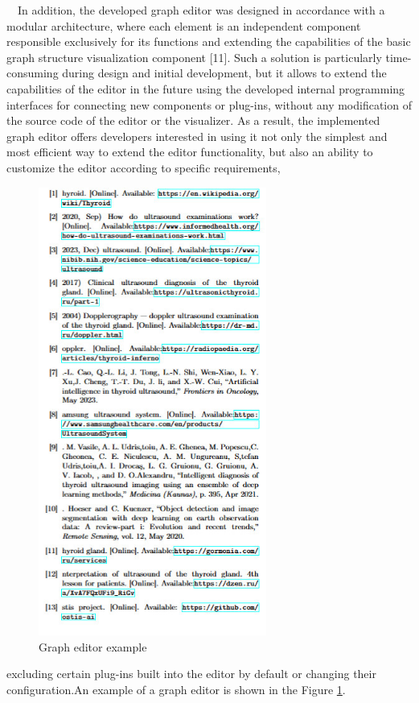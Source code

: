 \documentclass[a4paper]{article}
\begin{document}
\begin{multicols}{2}
\begin{justify}
~~In addition, the developed graph editor was designed
in accordance with a modular architecture, where each
element is an independent component responsible exclusively for its functions and extending the capabilities of
the basic graph structure visualization component [11].
Such a solution is particularly time-consuming during
design and initial development, but it allows to extend
the capabilities of the editor in the future using the developed internal programming interfaces for connecting
new components or plug-ins, without any modification of
the source code of the editor or the visualizer. As a result,
the implemented graph editor offers developers interested
in using it not only the simplest and most efficient way
to extend the editor functionality, but also an ability to
customize the editor according to specific requirements,
\newpage
\begin{figure}[H]
    \centering
    \includegraphics[width=7.5cm]{2.jpg}
    \caption{Graph editor example\label{6}}
 \end{figure}
 \vspace{-5cm}
excluding certain plug-ins built into the editor by default
or changing their configuration.An example of a graph editor is shown in the Figure \ref{6}.


\end{justify}
\end{multicols}
\end{document}
